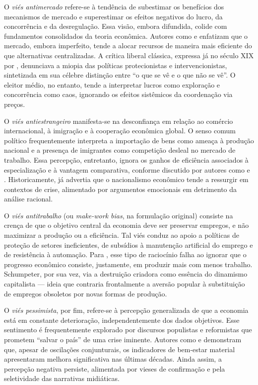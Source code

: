 O \textit{viés antimercado} refere-se à tendência de subestimar os benefícios dos mecanismos de mercado e superestimar os efeitos negativos do lucro, da concorrência e da desregulação. Essa visão, embora difundida, colide com fundamentos consolidados da teoria econômica. Autores como  e  enfatizam que o mercado, embora imperfeito, tende a alocar recursos de maneira mais eficiente do que alternativas centralizadas. A crítica liberal clássica, expressa já no século XIX por , denunciava a miopia das políticas protecionistas e intervencionistas, sintetizada em sua célebre distinção entre ``o que se vê e o que não se vê''. O eleitor médio, no entanto, tende a interpretar lucros como exploração e concorrência como caos, ignorando os efeitos sistêmicos da coordenação via preços.

O \textit{viés antiestrangeiro} manifesta-se na desconfiança em relação ao comércio internacional, à imigração e à cooperação econômica global. O senso comum político frequentemente interpreta a importação de bens como ameaça à produção nacional e a presença de imigrantes como competição desleal no mercado de trabalho. Essa percepção, entretanto, ignora os ganhos de eficiência associados à especialização e à vantagem comparativa, conforme discutido por autores como  e . Historicamente,  já advertia que o nacionalismo econômico tende a ressurgir em contextos de crise, alimentado por argumentos emocionais em detrimento da análise racional.

O \textit{viés antitrabalho} (ou \textit{make-work bias}, na formulação original) consiste na crença de que o objetivo central da economia deve ser preservar empregos, e não maximizar a produção ou a eficiência. Tal viés conduz ao apoio a políticas de proteção de setores ineficientes, de subsídios à manutenção artificial do emprego e de resistência à automação. Para , esse tipo de raciocínio falha ao ignorar que o progresso econômico consiste, justamente, em produzir mais com menos trabalho. Schumpeter, por sua vez, via a destruição criadora como essência do dinamismo capitalista — ideia que contraria frontalmente a aversão popular à substituição de empregos obsoletos por novas formas de produção.

O \textit{viés pessimista}, por fim, refere-se à percepção generalizada de que a economia está em constante deterioração, independentemente dos dados objetivos. Esse sentimento é frequentemente explorado por discursos populistas e reformistas que prometem ``salvar o país'' de uma crise iminente. Autores como  e  demonstram que, apesar de oscilações conjunturais, os indicadores de bem-estar material apresentaram melhora significativa nas últimas décadas. Ainda assim, a percepção negativa persiste, alimentada por vieses de confirmação e pela seletividade das narrativas midiáticas.

